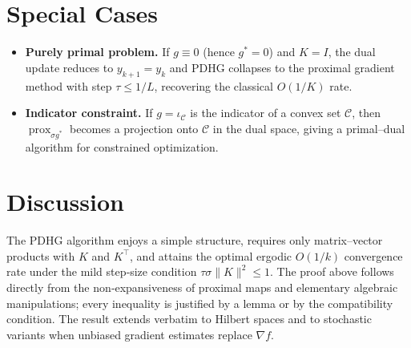 \documentclass{article}
\begin{document}
\section*{Special Cases}
\begin{itemize}
\item \textbf{Purely primal problem.} If $g\equiv0$ (hence $g^{*}=0$) and $K=I$, the dual update reduces to $y_{k+1}=y_{k}$ and PDHG collapses to the proximal gradient method with step $\tau\le1/L$, recovering the classical $O(1/K)$ rate.
\item \textbf{Indicator constraint.} If $g=\iota_{\mathcal{C}}$ is the indicator of a convex set $\mathcal{C}$, then $\operatorname{prox}_{\sigma g^{*}}$ becomes a projection onto $\mathcal{C}$ in the dual space, giving a primal–dual algorithm for constrained optimization.
\end{itemize}

\section*{Discussion}
The PDHG algorithm enjoys a simple structure, requires only matrix–vector products with $K$ and $K^{\!\top}$, and attains the optimal ergodic $O(1/k)$ convergence rate under the mild step‑size condition $\tau\sigma\|K\|^{2}\le1$. The proof above follows directly from the non‑expansiveness of proximal maps and elementary algebraic manipulations; every inequality is justified by a lemma or by the compatibility condition. The result extends verbatim to Hilbert spaces and to stochastic variants when unbiased gradient estimates replace $\nabla f$.
\end{document}
